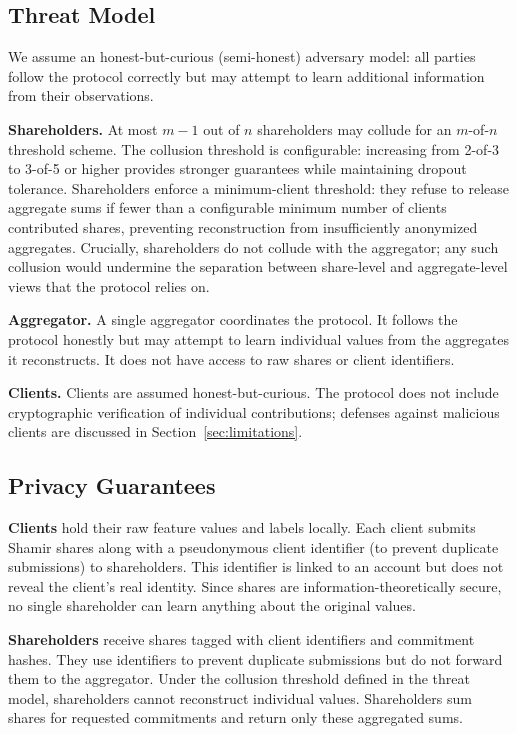 \documentclass[journal,10pt]{IEEEtran}
\begin{document}
\subsection{Threat Model}
\label{sec:threat-model}

We assume an honest-but-curious (semi-honest) adversary model: all parties follow the protocol correctly but may attempt to learn additional information from their observations.

\textbf{Shareholders.} At most $m-1$ out of $n$ shareholders may collude for an $m$-of-$n$ threshold scheme. The collusion threshold is configurable: increasing from 2-of-3 to 3-of-5 or higher provides stronger guarantees while maintaining dropout tolerance. Shareholders enforce a minimum-client threshold: they refuse to release aggregate sums if fewer than a configurable minimum number of clients contributed shares, preventing reconstruction from insufficiently anonymized aggregates. Crucially, shareholders do not collude with the aggregator; any such collusion would undermine the separation between share-level and aggregate-level views that the protocol relies on.

\textbf{Aggregator.} A single aggregator coordinates the protocol. It follows the protocol honestly but may attempt to learn individual values from the aggregates it reconstructs. It does not have access to raw shares or client identifiers.

\textbf{Clients.} Clients are assumed honest-but-curious. The protocol does not include cryptographic verification of individual contributions; defenses against malicious clients are discussed in Section~\ref{sec:limitations}.

\subsection{Privacy Guarantees}

\textbf{Clients} hold their raw feature values and labels locally. Each client submits Shamir shares along with a pseudonymous client identifier (to prevent duplicate submissions) to shareholders. This identifier is linked to an account but does not reveal the client's real identity. Since shares are information-theoretically secure, no single shareholder can learn anything about the original values.

\textbf{Shareholders} receive shares tagged with client identifiers and commitment hashes. They use identifiers to prevent duplicate submissions but do not forward them to the aggregator. Under the collusion threshold defined in the threat model, shareholders cannot reconstruct individual values. Shareholders sum shares for requested commitments and return only these aggregated sums.
\end{document}
